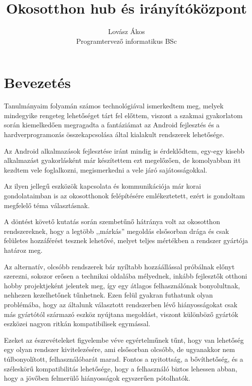 \documentclass[]{thesis-ekf}
\theoremstyle{definition}
\theoremstyle{remark}
\begin{document}
\title{Okosotthon hub és irányítóközpont}
\author{Lovász Ákos\\Programtervező informatikus BSc}
\date{\the\year{}}
\maketitle
\tableofcontents

\chapter*{Bevezetés}
Tanulmányaim folyamán számos technológiával ismerkedtem meg, melyek mindegyike rengeteg
lehetőséget tárt fel előttem, viszont a szakmai gyakorlatom során kiemelkedően megragadta a fantáziámat az Android
fejlesztés és a hardverprogramozás összekapcsolása által kialakult rendszerek lehetősége.


Az Android alkalmazások fejlesztése iránt mindig is érdeklődtem, egy-egy kisebb alkalmazást gyakorlásként
már készítettem ezt megelőzően, de komolyabban itt kezdtem vele foglalkozni, megismerkedni a vele járó
sajátosságokkal.


Az ilyen jellegű eszközök kapcsolata és kommunikációja már korai gondolataimban is az okosotthonok felépítésére
emlékeztetett, ezért is gondoltam megfelelő téma választásnak.


A döntést követő kutatás során szembetűnő hátránya volt az okosotthon rendszereknek, hogy a legtöbb ,,márkás''
megoldás elsősorban drága és csak felületes hozzáférést tesznek lehetővé, melyet teljes mértékben a rendszer
gyártója határoz meg. 


Az alternatív, olcsóbb rendszerek bár nyíltabb hozzáállással próbálnak előnyt szerezni,
sokszor erősen a technikai oldalába mélyednek, inkább fejlesztők otthoni hobby projektjeként jelentek meg, 
így egy átlagos felhasználónak bonyolultnak, nehhezen kezelhetőnek tűnhetnek. Ezen felül gyakran futhatunk 
olyan problémába, hogy az általunk választott rendszerben lévő hiányosságokat csak más gyártótól származó 
eszköz nyújtana megoldást, viszont különböző gyártók eszközei nagyon ritkán kompatibilisek egymással.


Ezeket az észrevételeket figyelembe véve egyértelműnek tűnt, hogy van lehetőség egy olyan rendszer kivitelezésére,
ami elsősorban olcsóbb, de ugyanakkor nem túlbonyolított, felhasználóbarát marad. Fontos a nyitottság, a bővíthetőség,
és a széleskörű kompatibilitás lehetősége, hogy a felhasználó biztos lehessen abban, hogy a jövőben felmerülő
hiányosságok egyszerűen pótolhatók.
\end{document}
